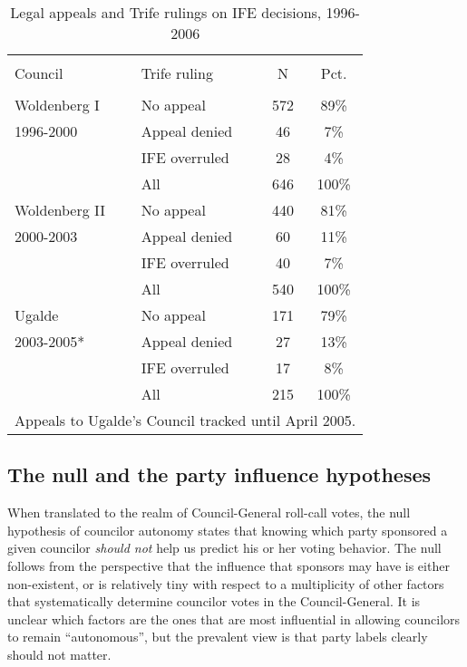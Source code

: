 \documentclass[12 pt, letter]{article}
\begin{document}
\begin{table}
\caption{Legal appeals and {\sc Trife} rulings on IFE decisions, 1996-2006}\label{T:rulings}
\begin{center}
\begin{tabular}{llcc}
\hline\\ [-1.5ex]
Council & {\sc Trife} ruling &  N  & Pct. \\
\hline \\ [-1ex]
Woldenberg I & No appeal  & 572 &  89\% \\
1996-2000 & Appeal denied &  46 &   7\% \\
          & IFE overruled &  28 &   4\% \\
          & All           & 646 & 100\% \\ [1.2ex]
Woldenberg II & No appeal & 440 &  81\% \\
2000-2003 & Appeal denied &  60 &  11\% \\
          & IFE overruled &  40 &   7\% \\
          & All           & 540 & 100\% \\ [1.2ex]
Ugalde    & No appeal     & 171 &  79\% \\
2003-2005* & Appeal denied &  27 &  13\% \\
          & IFE overruled &  17 &   8\% \\
          & All           & 215 & 100\% \\
\hline \multicolumn{4}{l}{\small * Appeals to Ugalde's Council
tracked until April 2005.}
\end{tabular}
\end{center}
\end{table}


\subsection{The null and the party influence hypotheses}
When translated to the realm of Council-General roll-call votes, the null hypothesis of councilor autonomy states that knowing which party sponsored a given councilor \emph{should not} help us predict his or her voting behavior. The null follows from the perspective that the influence that sponsors may have is either non-existent, or is relatively tiny with respect to a multiplicity of other factors that systematically determine councilor votes in the Council-General. It is unclear which  factors are the ones that are most influential in allowing  councilors to remain ``autonomous'', but the prevalent view is that party labels clearly should not matter.
\end{document}
